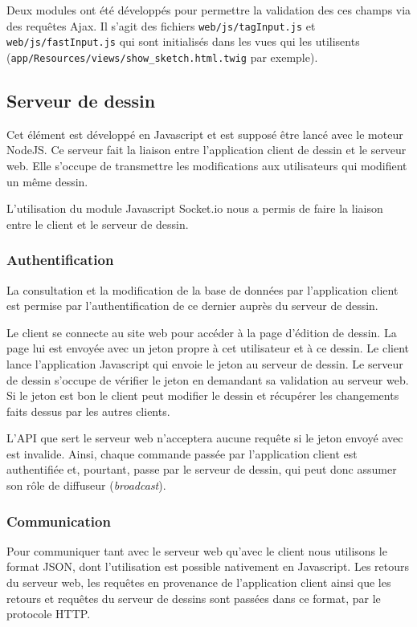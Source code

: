 \documentclass[a4paper]{article}
\begin{document}
Deux modules ont été développés pour permettre la validation des ces champs via des requêtes Ajax. Il s'agit des fichiers \texttt{web/js/tagInput.js} et \texttt{web/js/fastInput.js} qui sont initialisés dans les vues qui les utilisents (\texttt{app/Resources/views/show_sketch.html.twig} par exemple).

\subsection{Serveur de dessin}
Cet élément est développé en Javascript et est supposé être lancé avec le moteur \cite{NodeJS}NodeJS. Ce serveur fait la liaison entre l'application client de dessin et le serveur web. Elle s'occupe de transmettre les modifications aux utilisateurs qui modifient un même dessin.

L'utilisation du module Javascript Socket.io nous a permis de faire la liaison entre le client et le serveur de dessin.

\subsubsection{Authentification}
La consultation et la modification de la base de données par l'application client est permise par l'authentification de ce dernier auprès du serveur de dessin.

Le client se connecte au site web pour accéder à la page d'édition de dessin. La page lui est envoyée avec un jeton propre à cet utilisateur et à ce dessin. Le client lance l'application Javascript qui envoie le jeton au serveur de dessin. Le serveur de dessin s'occupe de vérifier le jeton en demandant sa validation au serveur web. Si le jeton est bon le client peut modifier le dessin et récupérer les changements faits dessus par les autres clients.

L'API que sert le serveur web n'acceptera aucune requête si le jeton envoyé avec est invalide. Ainsi, chaque commande passée par l'application client est authentifiée et, pourtant, passe par le serveur de dessin, qui peut donc assumer son rôle de diffuseur (\textit{broadcast}).

\subsubsection{Communication}
Pour communiquer tant avec le serveur web qu'avec le client nous utilisons le format JSON, dont l'utilisation est possible nativement en Javascript. Les retours du serveur web, les requêtes en provenance de l'application client ainsi que les retours et requêtes du serveur de dessins sont passées dans ce format, par le protocole HTTP.
\end{document}
